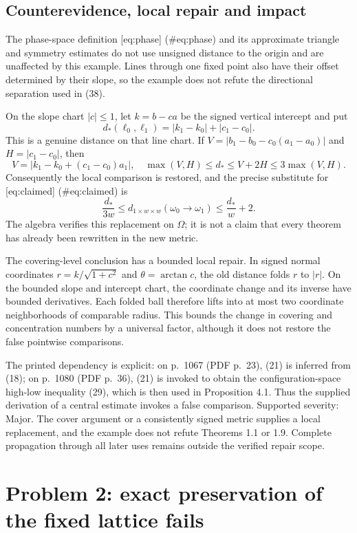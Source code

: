 \documentclass[10pt]{article}
\begin{document}
\subsection*{Counterevidence, local repair and impact}
The phase-space definition [eq:phase] (\#eq:phase) and its approximate triangle and symmetry estimates do not use unsigned distance to the origin and are unaffected by this example. Lines through one fixed point also have their offset determined by their slope, so the example does not refute the directional separation used in (38).\par
On the slope chart \(|c|\leq1\), let \(k=b-ca\) be the signed vertical intercept and put \[d_*(\ell_0,\ell_1)=|k_1-k_0|+|c_1-c_0|.\] This is a genuine distance on that line chart. If \(V=|b_1-b_0-c_0(a_1-a_0)|\) and \(H=|c_1-c_0|\), then \[V=|k_1-k_0+(c_1-c_0)a_1|,\quad
\max(V,H)\leq d_*\leq V+2H\leq3\max(V,H).\] Consequently the local comparison is restored, and the precise substitute for [eq:claimed] (\#eq:claimed) is \[\frac{d_*}{3w}\leq d_{1\times w\times w}(\omega_0\to\omega_1)
\leq \frac{d_*}{w}+2.\] The algebra verifies this replacement on \(\Omega\); it is not a claim that every theorem has already been rewritten in the new metric.\par
The covering-level conclusion has a bounded local repair. In signed normal coordinates \(r=k/\sqrt{1+c^2}\) and \(\theta=\arctan c\), the old distance folds \(r\) to \(|r|\). On the bounded slope and intercept chart, the coordinate change and its inverse have bounded derivatives. Each folded ball therefore lifts into at most two coordinate neighborhoods of comparable radius. This bounds the change in covering and concentration numbers by a universal factor, although it does not restore the false pointwise comparisons.\par
The printed dependency is explicit: on p. 1067 (PDF p. 23), (21) is inferred from (18); on p. 1080 (PDF p. 36), (21) is invoked to obtain the configuration-space high-low inequality (29), which is then used in Proposition 4.1. Thus the supplied derivation of a central estimate invokes a false comparison. Supported severity: Major. The cover argument or a consistently signed metric supplies a local replacement, and the example does not refute Theorems 1.1 or 1.9. Complete propagation through all later uses remains outside the verified repair scope.\par
\section*{Problem 2: exact preservation of the fixed lattice fails}
\end{document}
